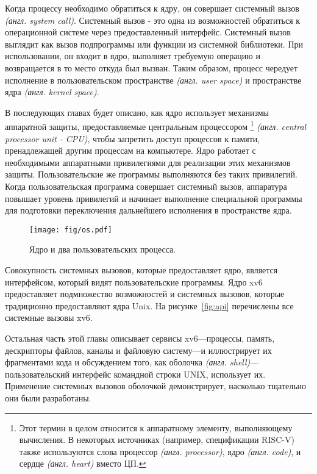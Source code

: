 Когда процессу необходимо обратиться к ядру,
он совершает системный вызов \emph{(англ. system call)}.
Системный вызов - это одна из возможностей обратиться
к операционной системе через предоставленный интерфейс.
Системный вызов выглядит как вызов
подпрограммы или функции из системной библиотеки.
При использовании, он входит в ядро,
выполняет требуемую операцию и возвращается
в то место откуда был вызван.
Таким образом, процесс чередует исполнение
в пользовательском пространстве \emph{(англ. user space)}
и пространстве ядра \emph{(англ. kernel space)}.

В последующих главах будет описано,
как ядро использует механизмы аппаратной защиты,
предоставляемые центральным процессором
\footnote{
  Этот термин в целом относится к аппаратному элементу,
  выполняющему вычисления.
  В некоторых источниках (например, спецификации RISC-V)
  также используются слова
  процессор \emph{(англ. processor)},
  ядро \emph{(англ. code)},
  и сердце \emph{(англ. heart)} вместо ЦП.
}
\emph{(англ. central processor unit - CPU)},
чтобы запретить доступ процессов к памяти,
пренадлежащей другим процессам на компьютере.
Ядро работает с необходимыми аппаратными привилегиями
для реализации этих механизмов защиты.
Пользовательские же программы выполняются без таких привилегий.
Когда пользовательская программа
совершает системный вызов,
аппаратура повышает уровень привилегий
и начинает выполнение специальной программы
для подготовки переключения дальнейшего исполнения
в пространстве ядра.

\begin{figure}[t]
\center
\texttt{[image: fig/os.pdf]}
\caption{Ядро и два пользовательских процесса.}
\label{fig:os}
\end{figure}

Совокупность системных вызовов,
которые предоставляет ядро,
является интерфейсом,
который видят пользовательские программы.
Ядро xv6 предоставляет подмножество
возможностей и системных вызовов,
которые традиционно предоставляют ядра Unix.
На рисунке~\ref{fig:api}
перечислены все системные вызовы xv6.

Остальная часть этой главы описывает
сервисы xv6---процессы, память, дескрипторы файлов,
каналы и файловую систему---и иллюстрирует их
фрагментами кода и обсуждением того,
как оболочка \emph{(англ. shell)}---
пользовательский интерфейс командной строки UNIX, использует их.
Применение системных вызовов оболочкой демонстрирует,
насколько тщательно они были разработаны.

